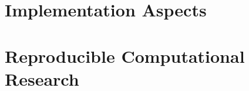 \documentclass[b5paper,oneside,british,intoc,bibliograph=totoc,index=totoc,BCOR10mm,twoside,openright]{book}
\numberwithin{equation}{section}
\numberwithin{figure}{section}
\begin{document}
%
%
%
%
%
%
%
\section{Implementation Aspects} \label{sec:integrhoimpl}

\section{Reproducible Computational Research} \label{sec:integrhorr}

%
%
\end{document}

